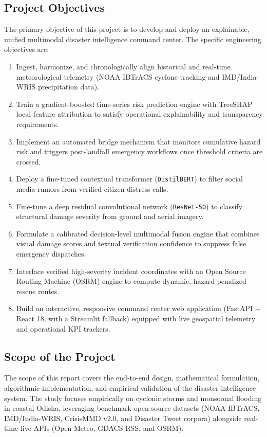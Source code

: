 \documentclass{article}
\begin{document}
\subsection{Project Objectives}
The primary objective of this project is to develop and deploy an explainable, unified multimodal disaster intelligence command center. The specific engineering objectives are:
\begin{enumerate}[label=\arabic*.]
    \item Ingest, harmonize, and chronologically align historical and real-time meteorological telemetry (NOAA IBTrACS cyclone tracking and IMD/India-WRIS precipitation data).
    \item Train a gradient-boosted time-series risk prediction engine with TreeSHAP local feature attribution to satisfy operational explainability and transparency requirements.
    \item Implement an automated bridge mechanism that monitors cumulative hazard risk and triggers post-landfall emergency workflows once threshold criteria are crossed.
    \item Deploy a fine-tuned contextual transformer (\texttt{DistilBERT}) to filter social media rumors from verified citizen distress calls.
    \item Fine-tune a deep residual convolutional network (\texttt{ResNet-50}) to classify structural damage severity from ground and aerial imagery.
    \item Formulate a calibrated decision-level multimodal fusion engine that combines visual damage scores and textual verification confidence to suppress false emergency dispatches.
    \item Interface verified high-severity incident coordinates with an Open Source Routing Machine (OSRM) engine to compute dynamic, hazard-penalized rescue routes.
    \item Build an interactive, responsive command center web application (FastAPI + React 18, with a Streamlit fallback) equipped with live geospatial telemetry and operational KPI trackers.
\end{enumerate}

\subsection{Scope of the Project}
The scope of this report covers the end-to-end design, mathematical formulation, algorithmic implementation, and empirical validation of the disaster intelligence system. The study focuses empirically on cyclonic storms and monsoonal flooding in coastal Odisha, leveraging benchmark open-source datasets (NOAA IBTrACS, IMD/India-WRIS, CrisisMMD v2.0, and Disaster Tweet corpora) alongside real-time live APIs (Open-Meteo, GDACS RSS, and OSRM).
\end{document}
